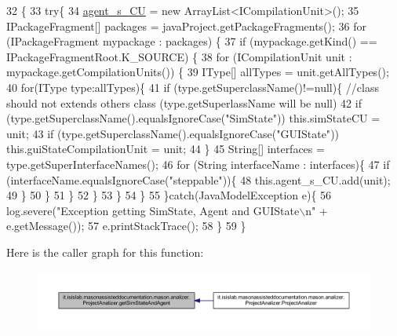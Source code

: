 \begin{DoxyCode}
32                                       \{
33         \textcolor{keywordflow}{try}\{
34             \hyperlink{classit_1_1isislab_1_1masonassisteddocumentation_1_1mason_1_1analizer_1_1_project_analizer_ac580240681056ef8e031f6422c3d5260}{agent\_s\_CU} = \textcolor{keyword}{new} ArrayList<ICompilationUnit>();
35             IPackageFragment[] packages = javaProject.getPackageFragments();
36             \textcolor{keywordflow}{for} (IPackageFragment mypackage : packages) \{
37               \textcolor{keywordflow}{if} (mypackage.getKind() == IPackageFragmentRoot.K\_SOURCE) \{
38                   \textcolor{keywordflow}{for} (ICompilationUnit unit : mypackage.getCompilationUnits()) \{
39                       IType[] allTypes = unit.getAllTypes();
40                       \textcolor{keywordflow}{for}(IType type:allTypes)\{
41                           \textcolor{keywordflow}{if} (type.getSuperclassName()!=null)\{  \textcolor{comment}{//class should not extends others class
       (type.getSuperlassName will be null)}
42                               \textcolor{keywordflow}{if} (type.getSuperclassName().equalsIgnoreCase(\textcolor{stringliteral}{"SimState"}))    this.simStateCU
       = unit;
43                               \textcolor{keywordflow}{if} (type.getSuperclassName().equalsIgnoreCase(\textcolor{stringliteral}{"GUIState"}))    
      this.guiStateCompilationUnit = unit;
44                           \}
45                           String[] interfaces = type.getSuperInterfaceNames();
46                           \textcolor{keywordflow}{for} (String interfaceName : interfaces)\{
47                               \textcolor{keywordflow}{if} (interfaceName.equalsIgnoreCase(\textcolor{stringliteral}{"steppable"}))\{
48                                   this.agent\_s\_CU.add(unit);
49                               \}
50                           \}
51                       \}
52                 \}   
53               \}
54             \}
55         \}\textcolor{keywordflow}{catch}(JavaModelException e)\{
56             log.severe(\textcolor{stringliteral}{"Exception getting SimState, Agent and GUIState\(\backslash\)n"} + e.getMessage());
57             e.printStackTrace();
58         \}
59     \}
\end{DoxyCode}


Here is the caller graph for this function\-:
\nopagebreak
\begin{figure}[H]
\begin{center}
\leavevmode
\includegraphics[width=350pt]{classit_1_1isislab_1_1masonassisteddocumentation_1_1mason_1_1analizer_1_1_project_analizer_afcd562563e79077b216ab70ba1ba5dc6_icgraph}
\end{center}
\end{figure}


